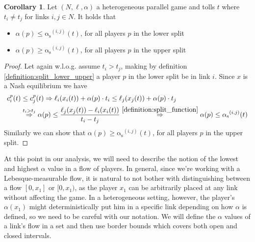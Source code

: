 \documentclass[10pt,a4paper]{book}
\newcommand{\RightarrowArg}[1]{\stackrel{#1}{\Rightarrow}}
\newcommand{\as}{\mathrm{\alpha_s}}
\theoremstyle{definition}
\newtheorem{corollary}[definition]{Corollary}
\theoremstyle{comment}
\begin{document}
\begin{corollary}
	\label{corollary:split_to_alpha}
	Let $(N, \ell, \alpha)$ a heterogeneous parallel game and tolls $t$ where $t_i \ne t_j$ for links $i, j \in N$.
	It holds that
	\begin{itemize}
		\item $\alpha(p) \le \as^{(i, j)}(t)$, for all players $p$ in the lower split
		\item $\alpha(p) \ge \as^{(i, j)}(t)$, for all players $p$ in the upper split
	\end{itemize}
\end{corollary}

\begin{proof}
	Let again w.l.o.g. assume $t_i > t_j$, making by definition \ref{definition:split_lower_upper} a player $p$ in the lower split be in link $i$.
	Since $x$ is a Nash equilibrium we have
	\begin{align*}
		c_i^p(t) &\le c_j^p(t) \Rightarrow \ell_i(x_i(t)) + \alpha(p) \cdot t_i \le \ell_j(x_j(t)) + \alpha(p) \cdot t_j \\
		&\RightarrowArg{t_i > t_j} \alpha(p) \le \frac{\ell_j(x_j(t)) - \ell_i(x_i(t))}{t_i - t_j} \RightarrowArg{\ref{definition:split_function}} \alpha(p) \le \as^{(i, j)}(t)
	\end{align*}
	Similarly we can show that $\alpha(p) \ge \as^{(i, j)}(t)$, for all players $p$ in the upper split.
\end{proof}

At this point in our analysis, we will need to describe the notion of the lowest and highest $\alpha$ value in a flow of players.
In general, since we're working with a Lebesque-measurable flow, it is natural to not bother with distinguishing between a flow $[0, x_1]$ or $[0, x_1)$, as the player $x_1$ can be arbitrarily placed at any link without affecting the game.
In a heterogeneous setting, however, the player's $\alpha(x_1)$ might deterministically put him in a specific link depending on how $\alpha$ is defined, so we need to be careful with our notation.
We will define the $\alpha$ values of a link's flow in a set and then use border bounds which covers both open and closed intervals.
\end{document}
